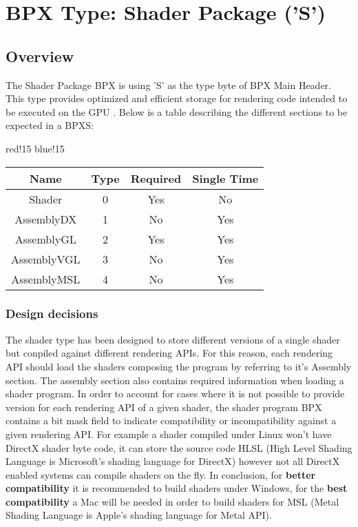 \section{BPX Type: Shader Package ('S')}

\subsection{Overview}
The Shader Package BPX is using 'S' as the type byte of BPX Main Header. This type provides optimized and efficient storage for rendering code intended to be executed on the GPU \cite{GPU}.
\newline
Below is a table describing the different sections to be expected in a BPXS:
\begin{center}
    {
        {red!15}
        {blue!15}
        \begin{tabular}{|c|c|c|c|}
            \hline
            \textbf{Name} & \textbf{Type} & \textbf{Required} & \textbf{Single Time} \\
    
            \hline\hline
            Shader & 0 & Yes & No \\
            AssemblyDX & 1 & No & Yes \\
            AssemblyGL & 2 & Yes & Yes \\
            AssemblyVGL & 3 & No & Yes \\
            AssemblyMSL & 4 & No & Yes \\
            \hline
        \end{tabular}
    }
\end{center}

\subsubsection{Design decisions}
The shader type has been designed to store different versions of a single shader but conpiled against different rendering APIs.\newline
For this reason, each rendering API should load the shaders composing the program by referring to it's Assembly section.\newline
The assembly section also contains required information when loading a shader program.\newline
In order to account for cases where it is not possible to provide version for each rendering API of a given shader, the shader program BPX contains a bit mask field to indicate compatibility or incompatibility against a given rendering API.\newline
For example a shader compiled under Linux won't have DirectX shader byte code, it can store the source code HLSL (High Level Shading Language is Microsoft's shading language for DirectX) however not all DirectX enabled systems can compile shaders on the fly.\newline
In conclusion, for \textbf{better compatibility} it is recommended to build shaders under Windows, for the \textbf{best compatibility} a Mac will be needed in order to build shaders for MSL (Metal Shading Language is Apple's shading language for Metal API).

